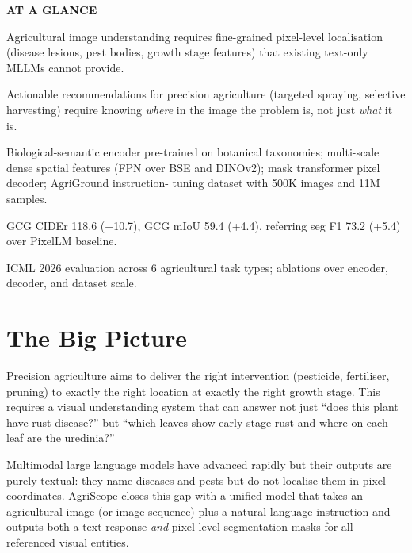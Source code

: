 \documentclass[10pt,twocolumn]{article}
\begin{document}
\begin{mdframed}[backgroundcolor=boxgray,linecolor=rulered,linewidth=1pt,
    innerleftmargin=6pt,innerrightmargin=6pt,
    innertopmargin=6pt,innerbottommargin=6pt]
\textbf{\small AT A GLANCE}\par\vspace{4pt}
\begin{description}[leftmargin=0pt,labelsep=4pt,itemsep=2pt,parsep=0pt,
    font=\small\bfseries]
  \item[Problem:] Agricultural image understanding requires fine-grained
    pixel-level localisation (disease lesions, pest bodies, growth
    stage features) that existing text-only MLLMs cannot provide.
  \item[Why it matters:] Actionable recommendations for precision
    agriculture (targeted spraying, selective harvesting) require knowing
    \emph{where} in the image the problem is, not just \emph{what} it is.
  \item[Method:] Biological-semantic encoder pre-trained on botanical
    taxonomies; multi-scale dense spatial features (FPN over BSE and
    DINOv2); mask transformer pixel decoder; AgriGround instruction-
    tuning dataset with 500K images and 11M samples.
  \item[Result:] GCG CIDEr 118.6 (+10.7), GCG mIoU 59.4 (+4.4),
    referring seg F1 73.2 (+5.4) over PixelLM baseline.
  \item[Evidence:] ICML 2026 evaluation across 6 agricultural task types;
    ablations over encoder, decoder, and dataset scale.
\end{description}
\end{mdframed}

\section{The Big Picture}

Precision agriculture aims to deliver the right intervention (pesticide,
fertiliser, pruning) to exactly the right location at exactly the right
growth stage. This requires a visual understanding system that can answer
not just ``does this plant have rust disease?'' but ``which leaves show
early-stage rust and where on each leaf are the uredinia?''

Multimodal large language models have advanced rapidly but their outputs
are purely textual: they name diseases and pests but do not localise them
in pixel coordinates. AgriScope closes this gap with a unified model that
takes an agricultural image (or image sequence) plus a natural-language
instruction and outputs both a text response \emph{and} pixel-level
segmentation masks for all referenced visual entities.
\end{document}
